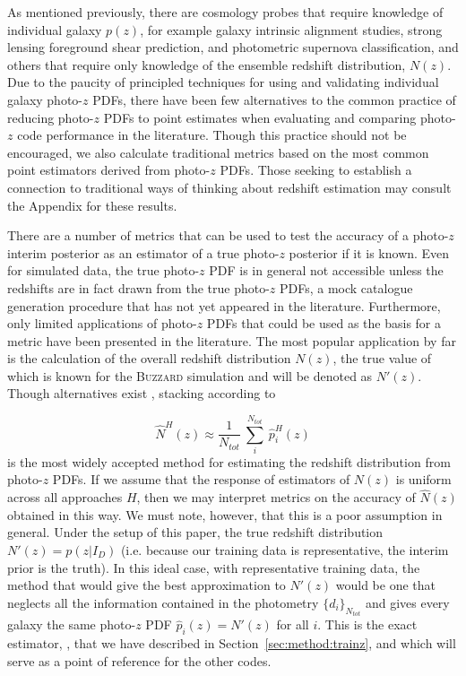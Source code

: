 As mentioned previously, there are cosmology probes that require knowledge of individual galaxy $p(z)$, for example galaxy intrinsic alignment studies, strong lensing foreground shear prediction, and photometric supernova classification, and others that require only knowledge of the ensemble redshift distribution, $N(z)$.
Due to the paucity of principled techniques for using and validating individual galaxy photo-$z$ PDFs, there have been few alternatives to the common practice of reducing photo-$z$ PDFs to point estimates when evaluating and comparing photo-$z$ code performance in the literature.
Though this practice should not be encouraged, we also calculate traditional metrics based on the most common point estimators derived from photo-$z$ PDFs.
Those seeking to establish a connection to traditional ways of thinking about redshift estimation may consult the Appendix for these results.

There are a number of metrics that can be used to test the accuracy of a photo-$z$ interim posterior as an estimator of a true photo-$z$ posterior if it is known.
Even for simulated data, the true photo-$z$ PDF is in general not accessible unless the redshifts are in fact drawn from the true photo-$z$ PDFs, a mock catalogue generation procedure that has not yet appeared in the literature.
Furthermore, only limited applications of photo-$z$ PDFs that could be used as the basis for a metric have been presented in the literature.
The most popular application by far is the calculation of the overall redshift distribution $N(z)$, the true value of which is known for the \textsc{Buzzard} simulation and will be denoted as $N'(z)$.
Though alternatives exist \citep{Malz:chippr}, stacking according to

\begin{equation} \label{eq:stacked}
\hat{N}^{H}(z) \approx \frac{1}{N_{tot}}\ \sum_{i}^{N_{tot}}\ \hat{p}^{H}_{i}(z)
\end{equation}
is the most widely accepted method for estimating the redshift distribution from photo-$z$ PDFs.
If we assume that the response of estimators of $N(z)$ is uniform across all approaches $H$, then we may interpret metrics on the accuracy of $\hat{N}(z)$ obtained in this way.
We must note, however, that this is a poor assumption in general.
Under the setup of this paper, the true redshift distribution $N'(z) = p(z | I_{D})$ (i.e. because our training data is representative, the interim prior is the truth).  In this ideal case, with representative training data, the method that would give the best approximation to $N'(z)$ would be one that neglects all the information contained in the photometry $\{d_{i}\}_{N_{tot}}$ and gives every galaxy the same photo-$z$ PDF $\hat{p}_{i}(z) = N'(z)$ for all $i$.  This is the exact estimator, \trainz, that we have described in Section~\ref{sec:method:trainz}, and which will serve as a point of reference for the other codes.

